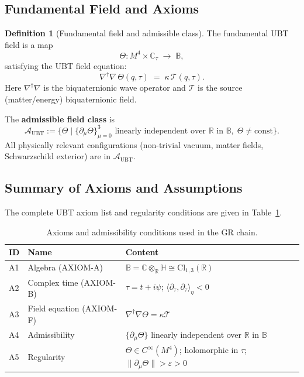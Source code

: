 \documentclass[12pt,a4paper]{article}
\theoremstyle{definition}
\newtheorem{definition}[theorem]{Definition}
\theoremstyle{remark}
\newcommand{\BB}{\mathbb{B}}
\newcommand{\CC}{\mathbb{C}}
\newcommand{\RR}{\mathbb{R}}
\newcommand{\HH}{\mathbb{H}}
\newcommand{\calA}{\mathcal{A}}
\newcommand{\calT}{\mathcal{T}}
\begin{document}
\subsection{Fundamental Field and Axioms}

\begin{definition}[Fundamental field and admissible class]
\label{def:theta}
The fundamental UBT field is a map
\[
  \Theta : M^4 \times \CC_\tau \;\longrightarrow\; \BB,
\]
satisfying the UBT field equation:
\[
  \nabla^\dagger\nabla\,\Theta(q,\tau) \;=\; \kappa\,\calT(q,\tau).
\]
Here $\nabla^\dagger\nabla$ is the biquaternionic wave operator and
$\calT$ is the source (matter/energy) biquaternionic field.

The \textbf{admissible field class} is
\[
  \calA_{\mathrm{UBT}} :=
  \bigl\{\Theta \;\big|\; \{\partial_\mu\Theta\}_{\mu=0}^3
  \text{ linearly independent over } \RR \text{ in } \BB,\;
  \Theta \neq \mathrm{const}\bigr\}.
\]
All physically relevant configurations (non-trivial vacuum, matter fields,
Schwarzschild exterior) are in $\calA_{\mathrm{UBT}}$.
\end{definition}

\subsection{Summary of Axioms and Assumptions}

The complete UBT axiom list and regularity conditions are given in
Table~\ref{tab:axioms}.

\begin{table}[ht]
\centering
\caption{Axioms and admissibility conditions used in the GR chain.}
\label{tab:axioms}
\begin{tabular}{lll}
\toprule
\textbf{ID} & \textbf{Name} & \textbf{Content} \\
\midrule
A1 & Algebra (AXIOM-A) & $\BB = \CC\otimes_\RR\HH \cong \mathrm{Cl}_{1,3}(\RR)$ \\
A2 & Complex time (AXIOM-B) & $\tau = t+i\psi$; $\langle\partial_\tau,\partial_\tau\rangle_\eta < 0$ \\
A3 & Field equation (AXIOM-F) & $\nabla^\dagger\nabla\Theta = \kappa\calT$ \\
A4 & Admissibility & $\{\partial_\mu\Theta\}$ linearly independent over $\RR$ in $\BB$ \\
A5 & Regularity & $\Theta \in C^\infty(M^4)$; holomorphic in $\tau$;
                   $\|\partial_\mu\Theta\| > \varepsilon > 0$ \\
\bottomrule
\end{tabular}
\end{table}
\end{document}

